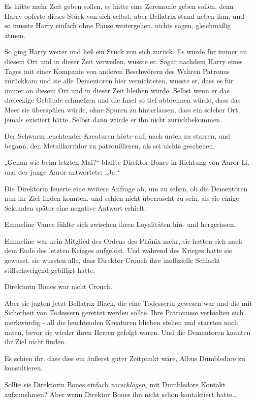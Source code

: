 {Es hätte mehr Zeit geben sollen, es hätte eine Zeremonie geben sollen, denn Harry opferte dieses Stück von sich selbst, aber Bellatrix stand neben ihm, und so musste Harry einfach ohne Pause weitergehen, nichts sagen, gleichmäßig atmen.

So ging Harry weiter und ließ ein Stück von sich zurück. Es würde für immer an diesem Ort und in dieser Zeit verweilen, wusste er. Sogar nachdem Harry eines Tages mit einer Kompanie von anderen Beschwörern des Wahren Patronus zurückkam und sie alle Dementoren hier vernichteten, wusste er, dass es für immer an diesem Ort und in dieser Zeit bleiben würde. Selbst wenn er das dreieckige Gebäude schmelzen und die Insel so tief abbrennen würde, dass das Meer sie überspülen würde, ohne Spuren zu hinterlassen, dass ein solcher Ort jemals existiert hätte. Selbst dann würde er ihn nicht zurückbekommen.

Der Schwarm leuchtender Kreaturen hörte auf, nach unten zu starren, und begann, den Metallkorridor zu patrouillieren, als sei nichts geschehen.

„Genau wie beim letzten Mal?“ blaffte Direktor Bones in Richtung von Auror Li, und der junge Auror antwortete: „Ja.“

Die Direktorin feuerte eine weitere Anfrage ab, um zu sehen, ob die Dementoren nun ihr Ziel finden konnten, und schien nicht überrascht zu sein, als sie einige Sekunden später eine negative Antwort erhielt.

Emmeline Vance fühlte sich zwischen ihren Loyalitäten hin- und hergerissen.

Emmeline war kein Mitglied des Ordens des Phönix mehr, sie hatten sich nach dem Ende des letzten Krieges aufgelöst. Und während des Krieges hatte sie gewusst, sie wussten alle, dass Direktor Crouch ihre inoffizielle Schlacht stillschweigend gebilligt hatte.

Direktorin Bones war nicht Crouch.

Aber sie jagten jetzt Bellatrix Black, die eine Todesserin gewesen war und die mit Sicherheit von Todessern gerettet werden sollte. Ihre Patronusse verhielten sich merkwürdig - all die leuchtenden Kreaturen blieben stehen und starrten nach unten, bevor sie wieder ihren Herren gefolgt waren. Und die Dementoren konnten ihr Ziel nicht finden.

Es schien ihr, dass dies ein äußerst guter Zeitpunkt wäre, Albus Dumbledore zu konsultieren.

Sollte sie Direktorin Bones einfach \emph{vorschlagen}, mit Dumbledore Kontakt aufzunehmen? Aber wenn Direktor Bones ihn nicht schon kontaktiert hatte…

}
